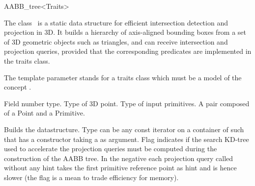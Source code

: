 \ccRefPageBegin


\begin{ccRefClass}{AABB_tree<Traits>}  %


\ccDefinition
  
The class \ccRefName\ is a static data structure for efficient intersection detection and projection in 3D. It builds a hierarchy of axis-aligned bounding boxes from a set of 3D geometric objects such as triangles, and can receive intersection and projection queries, provided that the corresponding predicates are implemented in the traits class. 

The template parameter  stands for a traits class which must be a model of the concept .


\ccTypes

          {Field number type.}
\ccGlue
{}
          {Type of 3D point.}
\ccGlue
{}
             {Type of input primitives.}
\ccGlue
{}
             {A pair composed of a Point and a Primitive.}


\ccCreation
{} %

{Builds the datastructure. Type  can be any const iterator on a container of  such that  has a constructor taking a  as argument. Flag  indicates if the search KD-tree used to accelerate the projection queries must be computed during the construction of the AABB tree. In the negative each projection query called without any hint takes the first primitive reference point as hint and is hence slower (the flag is a mean to trade efficiency for memory). }


\end{ccRefClass}
